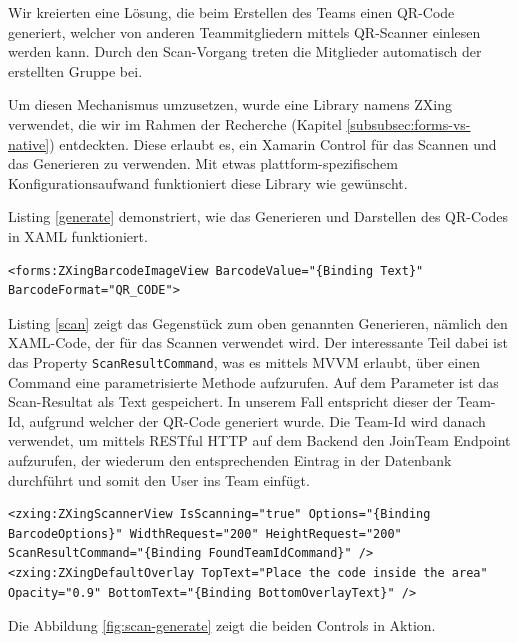 Wir kreierten eine Lösung, die beim Erstellen des Teams einen QR-Code generiert, welcher von anderen Teammitgliedern mittels QR-Scanner einlesen werden kann. Durch den Scan-Vorgang treten die Mitglieder automatisch der erstellten Gruppe bei.

Um diesen Mechanismus umzusetzen, wurde eine Library namens ZXing \cite{zxing.net} verwendet, die wir im Rahmen der Recherche (Kapitel \ref{subsubsec:forms-vs-native}) entdeckten. Diese erlaubt es, ein Xamarin Control für das Scannen und das Generieren zu verwenden. Mit etwas plattform-spezifischem Konfigurationsaufwand funktioniert diese Library wie gewünscht.

Listing \ref{generate} demonstriert, wie das Generieren und Darstellen des QR-Codes in XAML funktioniert.


\begin{lstlisting}[label=generate,caption=Verwendung der ZXing Library fürs Generieren des QR-Codes]
<forms:ZXingBarcodeImageView BarcodeValue="{Binding Text}"  BarcodeFormat="QR_CODE">
\end{lstlisting}


Listing \ref{scan} zeigt das Gegenstück zum oben genannten Generieren, nämlich den XAML-Code, der für das Scannen verwendet wird. Der interessante Teil dabei ist das Property \texttt{ScanResultCommand}, was es mittels MVVM erlaubt, über einen Command eine parametrisierte Methode aufzurufen. Auf dem Parameter ist das Scan-Resultat als Text gespeichert. In unserem Fall entspricht dieser der Team-Id, aufgrund welcher der QR-Code generiert wurde. Die Team-Id wird danach verwendet, um mittels RESTful HTTP auf dem Backend den JoinTeam Endpoint aufzurufen, der wiederum den entsprechenden Eintrag in der Datenbank durchführt und somit den User ins Team einfügt.


\begin{lstlisting}[label=scan,caption=XAML fürs Scannen von QR-Codes]
<zxing:ZXingScannerView IsScanning="true" Options="{Binding BarcodeOptions}" WidthRequest="200" HeightRequest="200" ScanResultCommand="{Binding FoundTeamIdCommand}" />
<zxing:ZXingDefaultOverlay TopText="Place the code inside the area" Opacity="0.9" BottomText="{Binding BottomOverlayText}" />
\end{lstlisting}

Die Abbildung \ref{fig:scan-generate} zeigt die beiden Controls in Aktion. 

